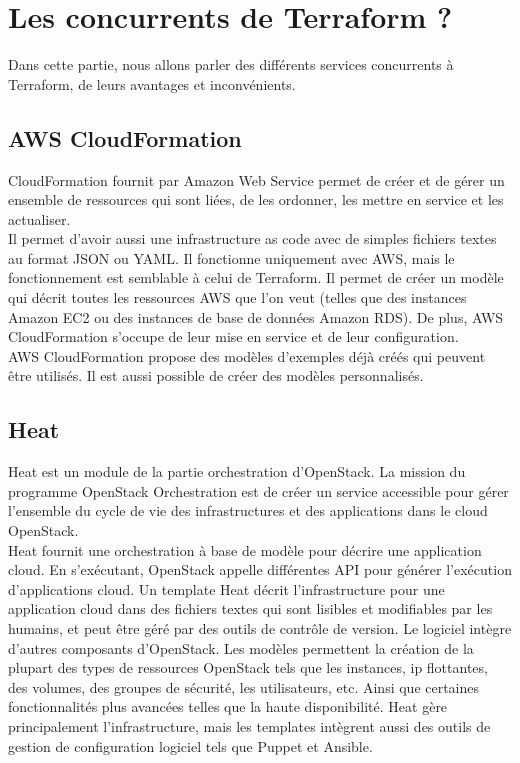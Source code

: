 \documentclass[]{article}
\begin{document}
\section{Les concurrents de Terraform ?}\label{avant-terraform}
Dans cette partie, nous allons parler des différents services concurrents à Terraform, de leurs avantages et inconvénients.
\subsection{AWS CloudFormation}\label{aws-cloudformation}
CloudFormation fournit par Amazon Web Service permet de créer et de
gérer un ensemble de ressources qui sont liées, de les ordonner, les
mettre en service et les actualiser. \\
Il permet d'avoir aussi une infrastructure as code avec de simples fichiers textes au
format JSON ou YAML. Il fonctionne uniquement avec AWS, mais le
fonctionnement est semblable à celui de  Terraform. Il permet de créer un modèle qui
décrit toutes les ressources AWS que l'on veut (telles que des instances
Amazon EC2 ou des instances de base de données Amazon RDS). De plus, AWS
CloudFormation s'occupe de leur mise en service et de leur
configuration.\\
AWS CloudFormation propose des modèles d'exemples déjà
créés qui peuvent être utilisés. Il est aussi possible de créer des
modèles personnalisés.
\subsection{Heat}\label{heat}
Heat est un module de la partie orchestration d'OpenStack. La mission du
programme OpenStack Orchestration est de créer un service accessible
pour gérer l'ensemble du cycle de vie des infrastructures et des
applications dans le cloud OpenStack. \\
Heat fournit une orchestration à
base de modèle pour décrire une application cloud. En s'exécutant,
OpenStack appelle différentes API pour générer l'exécution d'applications
cloud. Un template Heat décrit l'infrastructure pour une application
cloud dans des fichiers textes qui sont lisibles et modifiables par les
humains, et peut être géré par des outils de contrôle de version. Le
logiciel intègre d'autres composants d'OpenStack. Les modèles permettent
la création de la plupart des types de ressources OpenStack tels que les
instances, ip flottantes, des volumes, des groupes de sécurité, les
utilisateurs, etc. Ainsi que certaines fonctionnalités plus avancées
telles que la haute disponibilité. Heat gère principalement
l'infrastructure, mais les templates intègrent aussi des outils de
gestion de configuration logiciel tels que Puppet et Ansible.
\end{document}
